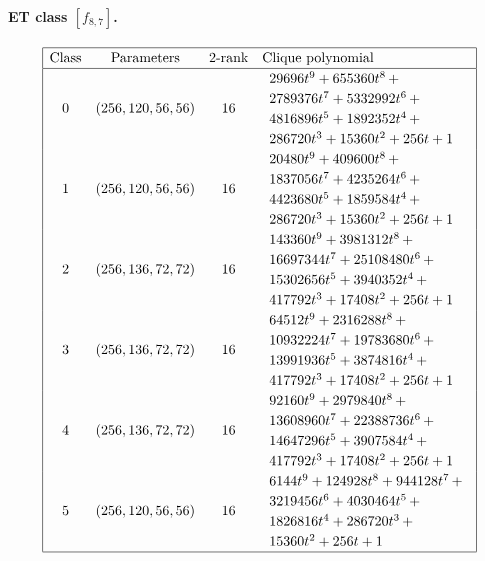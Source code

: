\documentclass[12pt,a4paper]{article}
\begin{document}
\paragraph*{ET class $[f_{8,7}]$.}
\small{}
\begin{align*}
\def\arraystretch{1.2}
\begin{array}{|cccl|}
\hline
\text{Class} &
\text{Parameters} &
\text{2-rank} &
\text{Clique polynomial}
\\
\hline
0 &
(256, 120, 56, 56) &
16 &
\begin{array}{l}
29696t^{9} + 655360t^{8}
\,+
\\
 2789376t^{7} + 5332992t^{6}
\,+
\\
 4816896t^{5} + 1892352t^{4}
\,+
\\
 286720t^{3} + 15360t^{2} + 256t + 1
\end{array}
\\
1 &
(256, 120, 56, 56) &
16 &
\begin{array}{l}
20480t^{9} + 409600t^{8}
\,+
\\
 1837056t^{7} + 4235264t^{6}
\,+
\\
 4423680t^{5} + 1859584t^{4}
\,+
\\
 286720t^{3} + 15360t^{2} + 256t + 1
\end{array}
\\
2 &
(256, 136, 72, 72) &
16 &
\begin{array}{l}
143360t^{9} + 3981312t^{8}
\,+
\\
 16697344t^{7} + 25108480t^{6}
\,+
\\
 15302656t^{5} + 3940352t^{4}
\,+
\\
 417792t^{3} + 17408t^{2} + 256t + 1
\end{array}
\\
3 &
(256, 136, 72, 72) &
16 &
\begin{array}{l}
64512t^{9} + 2316288t^{8}
\,+
\\
 10932224t^{7} + 19783680t^{6}
\,+
\\
 13991936t^{5} + 3874816t^{4}
\,+
\\
 417792t^{3} + 17408t^{2} + 256t + 1
\end{array}
\\
4 &
(256, 136, 72, 72) &
16 &
\begin{array}{l}
92160t^{9} + 2979840t^{8}
\,+
\\
 13608960t^{7} + 22388736t^{6}
\,+
\\
 14647296t^{5} + 3907584t^{4}
\,+
\\
 417792t^{3} + 17408t^{2} + 256t + 1
\end{array}
\\
5 &
(256, 120, 56, 56) &
16 &
\begin{array}{l}
6144t^{9} + 124928t^{8} + 944128t^{7}
\,+
\\
 3219456t^{6} + 4030464t^{5}
\,+
\\
 1826816t^{4} + 286720t^{3}
\,+
\\
 15360t^{2} + 256t + 1
\end{array}
\\
\hline
\end{array}
\end{align*}
\end{document}
